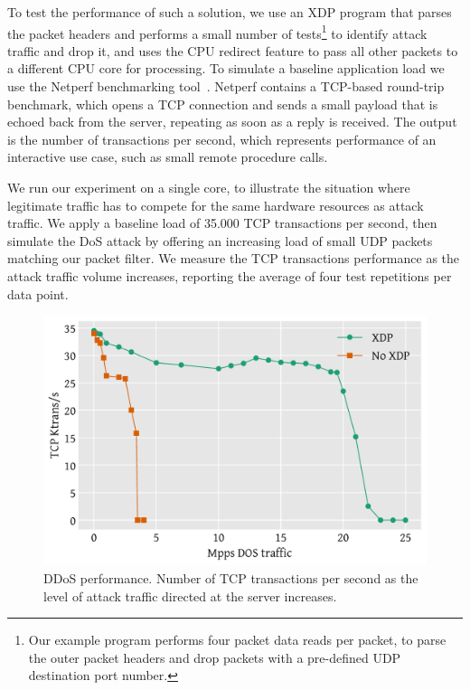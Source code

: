 \documentclass[sigconf]{acmart}
\begin{document}
To test the performance of such a solution, we use an XDP program that parses
the packet headers and performs a small number of tests\footnote{Our example
  program performs four packet data reads per packet, to parse the outer packet
  headers and drop packets with a pre-defined UDP destination port number.} to
identify attack traffic and drop it, and uses the CPU redirect feature to pass
all other packets to a different CPU core for processing. To simulate a baseline
application load we use the Netperf benchmarking tool~\cite{netperf}. Netperf
contains a TCP-based round-trip benchmark, which opens a TCP connection and
sends a small payload that is echoed back from the server, repeating as soon as
a reply is received. The output is the number of transactions per second, which
represents performance of an interactive use case, such as small remote
procedure calls.

We run our experiment on a single core, to illustrate the situation where
legitimate traffic has to compete for the same hardware resources as attack
traffic. We apply a baseline load of 35.000 TCP transactions per second, then
simulate the DoS attack by offering an increasing load of small UDP packets
matching our packet filter. We measure the TCP transactions performance as the
attack traffic volume increases, reporting the average of four test repetitions
per data point.

\begin{figure}[t]
\centering
\includegraphics[width=\linewidth]{figures/ddos-test.pdf}
\caption{\label{fig:ddos-results} DDoS performance. Number of TCP transactions
  per second as the level of attack traffic directed at the server increases.}
\end{figure}
\end{document}
